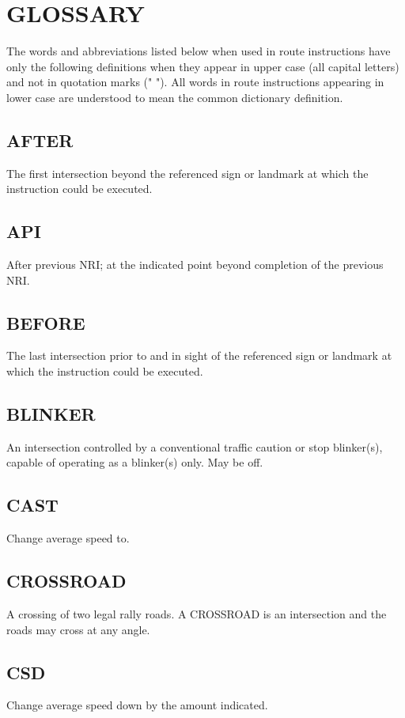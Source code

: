 \section{GLOSSARY}
The words and abbreviations listed below when used in route instructions have only the following definitions when they appear in upper case (all capital letters) and not in quotation marks (" "). All words in route instructions appearing in lower case are understood to mean the common dictionary definition.

\subsection{AFTER}
The first intersection beyond the referenced sign or landmark at which the instruction could be executed.

\subsection{API}
After previous NRI; at the indicated point beyond completion of the previous NRI.

\subsection{BEFORE}
The last intersection prior to and in sight of the referenced sign or landmark at which the instruction could be executed.

\subsection{BLINKER}
An intersection controlled by a conventional traffic caution or stop blinker(s), capable of operating as a blinker(s) only. May be off.

\subsection{CAST}
Change average speed to.

\subsection{CROSSROAD}
A crossing of two legal rally roads. A CROSSROAD is an intersection and the roads may cross at any angle.

\subsection{CSD}
Change average speed down by the amount indicated.

